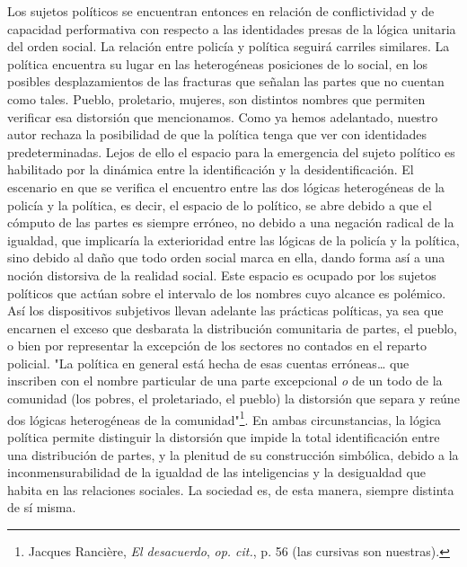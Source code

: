 \documentclass{book}
\begin{document}
Los sujetos políticos se encuentran entonces en relación de
conflictividad y de capacidad performativa con respecto a las
identidades presas de la lógica unitaria del orden social. La relación
entre policía y política seguirá carriles similares. La política
encuentra su lugar en las heterogéneas posiciones de lo social, en los
posibles desplazamientos de las fracturas que señalan las partes que no
cuentan como tales. Pueblo, proletario, mujeres, son distintos nombres
que permiten verificar esa distorsión que mencionamos. Como ya hemos
adelantado, nuestro autor rechaza la posibilidad de que la política
tenga que ver con identidades predeterminadas. Lejos de ello el espacio
para la emergencia del sujeto político es habilitado por la dinámica
entre la identificación y la desidentificación. El escenario en que se
verifica el encuentro entre las dos lógicas heterogéneas de la policía y
la política, es decir, el espacio de lo político, se abre debido a que
el cómputo de las partes es siempre erróneo, no debido a una negación
radical de la igualdad, que implicaría la exterioridad entre las lógicas
de la policía y la política, sino debido al daño que todo orden social
marca en ella, dando forma así a una noción distorsiva de la realidad
social. Este espacio es ocupado por los sujetos políticos que actúan
sobre el intervalo de los nombres cuyo alcance es polémico. Así los
dispositivos subjetivos llevan adelante las prácticas políticas, ya sea
que encarnen el exceso que desbarata la distribución comunitaria de
partes, el pueblo, o bien por representar la excepción de los sectores
no contados en el reparto policial. "La política en general está hecha
de esas cuentas erróneas\ldots{} que inscriben con el nombre particular
de una parte excepcional \emph{o} de un todo de la comunidad (los
pobres, el proletariado, el pueblo) la distorsión que separa y reúne dos
lógicas heterogéneas de la comunidad"\footnote{Jacques Rancière,
  \emph{El desacuerdo}, \emph{op. cit.}, p. 56 (las cursivas son
  nuestras).}. En ambas circunstancias, la lógica política permite
distinguir la distorsión que impide la total identificación entre una
distribución de partes, y la plenitud de su construcción simbólica,
debido a la inconmensurabilidad de la igualdad de las inteligencias y la
desigualdad que habita en las relaciones sociales. La sociedad es, de
esta manera, siempre distinta de sí misma.
\end{document}
